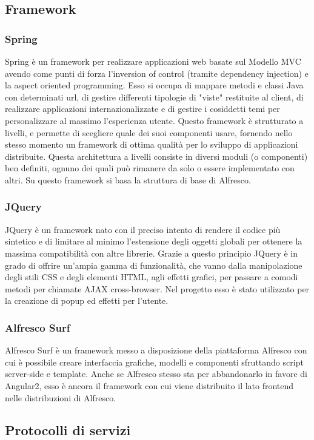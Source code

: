 \subsection{Framework}
\subsubsection{Spring}
Spring è un framework per realizzare applicazioni web basate sul Modello MVC
avendo come punti di forza l’inversion of control (tramite dependency injection) e la
aspect oriented programming. Esso si occupa di mappare metodi e classi Java con
determinati url, di gestire differenti tipologie di "viste" restituite al client, di realizzare
applicazioni internazionalizzate e di gestire i cosiddetti temi per personalizzare al
massimo l’esperienza utente. Questo framework è strutturato a livelli, e permette di
scegliere quale dei suoi componenti usare, fornendo nello stesso momento un framework di ottima qualità per lo sviluppo di applicazioni distribuite. Questa architettura a livelli consiste
in diversi moduli (o componenti) ben definiti, ognuno dei quali può rimanere da solo o
essere implementato con altri.
Su questo framework si basa la struttura di base di Alfresco.
\subsubsection{JQuery}
JQuery è un framework nato con il preciso intento di rendere il codice più sintetico
e di limitare al minimo l’estensione degli oggetti globali per ottenere la massima
compatibilità con altre librerie. Grazie a questo principio JQuery è in grado di offrire
un’ampia gamma di funzionalità, che vanno dalla manipolazione degli stili CSS e degli
elementi HTML, agli effetti grafici, per passare a comodi metodi per chiamate AJAX
cross-browser. Nel progetto esso è stato utilizzato per la creazione di popup ed effetti per l'utente.
\subsubsection{Alfresco Surf}
Alfresco Surf è un framework messo a disposizione della piattaforma Alfresco con cui è
possibile creare interfaccia grafiche, modelli e componenti sfruttando script server-side
e template.
Anche se Alfresco stesso sta per abbandonarlo in favore di Angular2, esso è ancora il framework con cui viene distribuito il lato frontend nelle distribuzioni di Alfresco.
\subsection{Protocolli di servizi}
